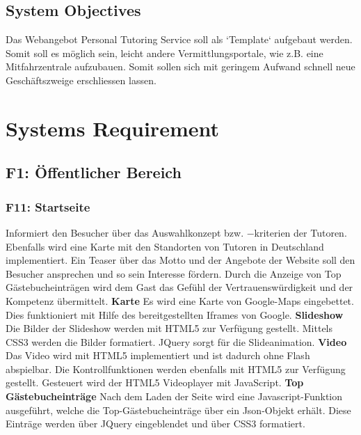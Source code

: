 \documentclass[10pt,a4paper]{scrartcl}
\begin{document}
\subsection{System Objectives}
Das Webangebot Personal Tutoring Service soll als `Template` aufgebaut werden.
Somit soll es möglich sein, leicht andere Vermittlungsportale, wie z.B. eine
Mitfahrzentrale aufzubauen. Somit sollen sich mit geringem Aufwand schnell neue
Geschäftszweige erschliessen lassen.

\section{Systems Requirement}

\subsection{F1: Öffentlicher Bereich}
\subsubsection*{F11: Startseite}
Informiert den Besucher über das Auswahlkonzept bzw. $-$kriterien der Tutoren. Ebenfalls wird eine Karte mit den Standorten von Tutoren in Deutschland implementiert. Ein Teaser über das Motto und der Angebote der Website soll den Besucher ansprechen und so sein Interesse fördern. Durch die Anzeige von Top Gästebucheinträgen wird dem Gast das Gefühl der Vertrauenswürdigkeit und der Kompetenz übermittelt.
\newline \newline
\textbf{Karte}\newline
Es wird eine Karte von Google-Maps eingebettet. Dies funktioniert mit Hilfe des bereitgestellten Iframes von Google.
\newline \newline
\textbf{Slideshow}\newline
Die Bilder der Slideshow werden mit HTML5 zur Verfügung gestellt. Mittels CSS3 werden die Bilder formatiert. JQuery sorgt für die Slideanimation.
\newline \newline
\textbf{Video}\newline
Das Video wird mit HTML5 implementiert und ist dadurch ohne Flash abspielbar. Die Kontrollfunktionen werden ebenfalls mit HTML5 zur Verfügung gestellt. Gesteuert wird der HTML5 Videoplayer mit JavaScript.
\newline \newline
\textbf{Top Gästebucheinträge}\newline
Nach dem Laden der Seite wird eine Javascript-Funktion ausgeführt, welche die Top-Gästebucheinträge über ein Json-Objekt erhält. Diese Einträge werden über JQuery eingeblendet und über CSS3 formatiert.
\end{document}
